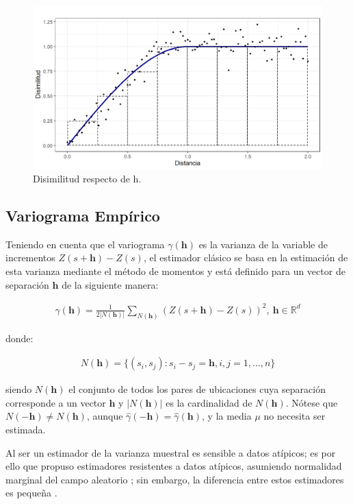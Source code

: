 \documentclass[
]{book}
\begin{document}
\begin{figure}
\includegraphics[width=17.78in]{figuras/otros/var_cloud} \caption{Disimilitud respecto de h.}\label{fig:varcloud}
\end{figure}

\hypertarget{variograma-empuxedrico}{%
\subsection{Variograma Empírico}\label{variograma-empuxedrico}}

Teniendo en cuenta que el variograma \(\gamma(\textbf{h})\) es la varianza de la variable de incrementos \(Z(s+\textbf{h})-Z(s)\), el estimador clásico se basa en la estimación de esta varianza mediante el método de momentos y está definido para un vector de separación \(\textbf{h}\) de la siguiente manera:

\begin{align}
  \hat{\gamma}(\textbf{h})=\frac{1}{2|N(\textbf{h})|}\sum_{N(\textbf{h})}(Z(s+\textbf{h})-Z(s))^2, \ \textbf{h}\in \mathbb{R}^d  
\end{align}

donde:

\begin{align}
  N(\textbf{h})=\{(s_i,s_j):s_i-s_j=\textbf{h}, i,j=1,...,n\}  
\end{align}

siendo \(N(\textbf{h})\) el conjunto de todos los pares de ubicaciones cuya separación corresponde a un vector \(\textbf{h}\) y \(|N(\textbf{h})|\) es la cardinalidad de \(N(\textbf{h})\). Nótese que \(N(-\textbf{h})\neq N(\textbf{h})\), aunque \(\hat{\gamma}(-\textbf{h})=\hat{\gamma}(\textbf{h})\), y la media \(\mu\) no necesita ser estimada.

Al ser un estimador de la varianza muestral es sensible a datos atípicos; es por ello que \citep{Cressi} propuso estimadores resistentes a datos atípicos, asumiendo normalidad marginal del campo aleatorio \citep{marta}; sin embargo, la diferencia entre estos estimadores es pequeña \citep{Cressi}.
\end{document}
